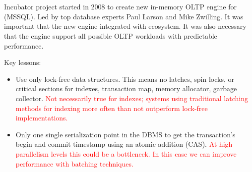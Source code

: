 \documentclass[11pt]{article}
\newcommand{\rr}[1]{\textcolor{red}{#1}}
\begin{document}
\maketitle
\thispagestyle{plain}

\section{}
Incubator project started in 2008 to create new in-memory OLTP engine for  (MSSQL). Led by top database experts Paul Larson and Mike Zwilling. It was important that the new 
engine integrated with  ecosystem. It was also necessary that the engine support all 
possible OLTP workloads with predictable performance.

Key lessons:
\begin{itemize}
    \item
    Use only lock-free data structures. This means no latches, spin locks, or critical 
    sections for indexes, transaction map, memory allocator, garbage collector. \rr{Not necessarily true for indexes; systems using traditional latching methods for indexing more often than not outperform lock-free implementations.}
        
    \item
    Only one single serialization point in the DBMS to get the transaction's begin and commit 
    timestamp using an atomic addition (CAS). \rr{At high parallelism levels this could be a bottleneck. In this case we can improve performance with batching techniques.}
\end{itemize}
\end{document}
